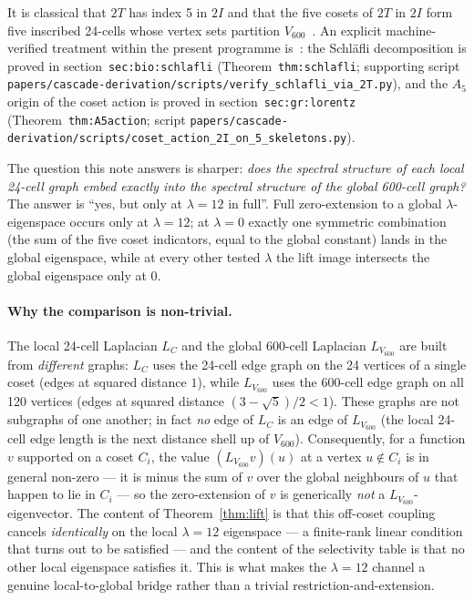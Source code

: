 \documentclass[11pt]{article}
\newcommand{\Vsix}{V_{600}}
\newcommand{\Lsix}{L_{\Vsix}}
\newcommand{\Loc}{L_{C}}
\newcommand{\twoI}{2I}
\newcommand{\twoT}{2T}
\theoremstyle{plain}
\theoremstyle{definition}
\begin{document}
It is classical that $\twoT$ has index 5 in $\twoI$ and that the
five cosets of $\twoT$ in $\twoI$ form five inscribed 24-cells whose
vertex sets partition $\Vsix$~\cite{Coxeter1973, ConwaySloane1999}.
An explicit machine-verified treatment within the present programme
is~\cite{SmartXXXV}: the Schl\"afli decomposition is proved in
section~\texttt{sec:bio:schlafli}
(Theorem~\texttt{thm:schlafli}; supporting script
\texttt{papers/}\allowbreak\texttt{cascade-derivation/}\allowbreak\texttt{scripts/}\allowbreak\texttt{verify\_schlafli\_via\_2T.py}),
and the $A_5$ origin of the coset action is proved in
section~\texttt{sec:gr:lorentz}
(Theorem~\texttt{thm:A5action}; script
\texttt{papers/}\allowbreak\texttt{cascade-derivation/}\allowbreak\texttt{scripts/}\allowbreak\texttt{coset\_action\_2I\_on\_5\_skeletons.py}).

The question this note answers is sharper: \emph{does the spectral
structure of each local 24-cell graph embed exactly into the spectral
structure of the global 600-cell graph?}  The answer is ``yes, but
only at $\lambda{=}12$ in full''.  Full zero-extension to a global
$\lambda$-eigenspace occurs only at $\lambda{=}12$; at $\lambda{=}0$
exactly one symmetric combination (the sum of the five coset
indicators, equal to the global constant) lands in the global
eigenspace, while at every other tested $\lambda$ the lift image
intersects the global eigenspace only at $0$.

\paragraph{Why the comparison is non-trivial.}
The local 24-cell Laplacian $\Loc$ and the global 600-cell Laplacian
$\Lsix$ are built from \emph{different} graphs: $\Loc$ uses the
24-cell edge graph on the 24 vertices of a single coset (edges at
squared distance $1$), while $\Lsix$ uses the 600-cell edge graph on
all 120 vertices (edges at squared distance $(3-\sqrt5)/2 < 1$).
These graphs are not subgraphs of one another; in fact \emph{no} edge
of $\Loc$ is an edge of $\Lsix$ (the local 24-cell edge length is the
next distance shell up of $\Vsix$).  Consequently, for a function $v$
supported on a coset $C_i$, the value $(\Lsix v)(u)$ at a vertex
$u\notin C_i$ is in general non-zero --- it is minus the sum of $v$
over the global neighbours of $u$ that happen to lie in $C_i$ --- so
the zero-extension of $v$ is generically \emph{not} a
$\Lsix$-eigenvector.  The content of Theorem~\ref{thm:lift} is that
this off-coset coupling cancels \emph{identically} on the local
$\lambda{=}12$ eigenspace --- a finite-rank linear condition that
turns out to be satisfied --- and the content of the selectivity
table is that no other local eigenspace satisfies it.  This is what
makes the $\lambda{=}12$ channel a genuine local-to-global bridge
rather than a trivial restriction-and-extension.
\end{document}
